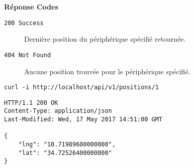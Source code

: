 \textbf{Réponse Codes}

\begin{description}
    \item[\texttt{200 Success}] Dernière position du périphérique spécifié retournée.
    \item[\texttt{404 Not Found}] Aucune position trouvée pour le périphérique spécifié.
\end{description}

\begin{listing}[H]
    \begin{verbatim}
curl -i http://localhost/api/v1/positions/1
\end{verbatim}
\begin{verbatim}
HTTP/1.1 200 OK
Content-Type: application/json
Last-Modified: Wed, 17 May 2017 14:51:00 GMT

{
    "lng": "10.71989600000000",
    "lat": "34.72526400000000"
}
\end{verbatim}
\end{listing}
